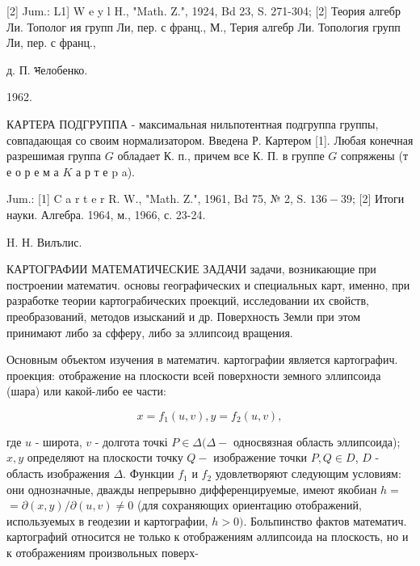 \documentclass[10pt]{article}
\begin{document}
[2] Jum.: L1] W e y l H., "Math. Z.", 1924, Bd 23, S. 271-304; [2] Теория алгебр Ли. Тополог ия групп Ли, пер. с франц., М., Терия алгебр Ли. Топология групп Ли, пер. с франц.,

д. П. भелобенко.

1962.



КАРТЕРА ПОДГРУППА - максимальная нильпотентная подгруппа группы, совпадающая со своим нормализатором. Введена Р. Картером [1]. Любая конечная разрешимая группа $G$ обладает К. п., причем все К. П. в группе $G$ сопряжены (т е о р е м а $K$ а р т е p a).



Jum.: [1] C a r t e r R. W., "Math. Z.", 1961, Bd 75, № 2, S. $136-39$; [2] Итоги науки. Алгебра. 1964, м., 1966, с. 23-24.

H. Н. Вилълис.



КАРТОГРАФИИ МАТЕМАТИЧЕСКИЕ ЗАДАЧИ задачи, возникающие при построении математич. основы географических и специальных карт, именно, при разработке теории картограбических проекций, исследовании их свойств, преобразований, методов изысканий и др. Поверхность Земли при этом принимают либо за сфферу, либо за эллипсоид вращения.



Основным объектом изучения в математич. картографии является картографич. проекция: отображение на плоскости всей поверхности земного эллипсоида (шара) или какой-либо ее части:



\[

x=f_{1}(u, v), y=f_{2}(u, v),

\]



где $u$ - широта, $v$ - долгота точкі $P \in \Delta(\Delta-$ односвязная область эллипсоида); $x, y$ определяют на плоскости точку $Q-$ изображение точки $P, Q \in D$, $D$ - область изображения $\Delta$. Функции $f_{1}$ и $f_{2}$ удовлетворяют следующим условиям: они однозначные, дважды непрерывно дифференцируемые, имеют якобиан $h=$ $=\partial(x, y) / \partial(u, v) \neq 0$ (для сохраняющих ориентацию отображений, используемых в геодезии и картографии, $h>0)$. Больпинство фактов математич. картографий относится не только к отображениям әллипсоида на плоскость, но и к отображениям произвольных поверх-
\end{document}
